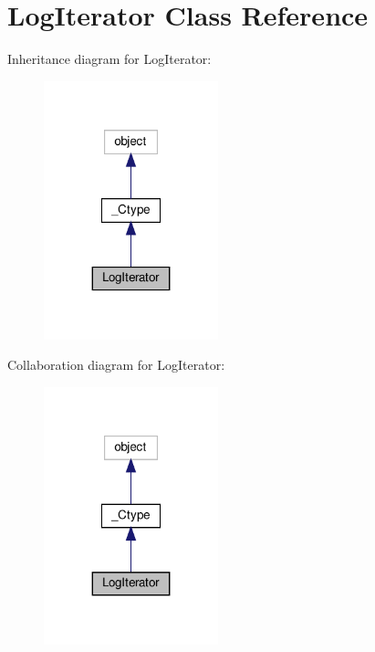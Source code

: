 \hypertarget{classvlc_1_1_log_iterator}{}\section{Log\+Iterator Class Reference}
\label{classvlc_1_1_log_iterator}


Inheritance diagram for Log\+Iterator\+:
\nopagebreak
\begin{figure}[H]
\begin{center}
\leavevmode
\includegraphics[width=143pt]{classvlc_1_1_log_iterator__inherit__graph}
\end{center}
\end{figure}


Collaboration diagram for Log\+Iterator\+:
\nopagebreak
\begin{figure}[H]
\begin{center}
\leavevmode
\includegraphics[width=143pt]{classvlc_1_1_log_iterator__coll__graph}
\end{center}
\end{figure}
